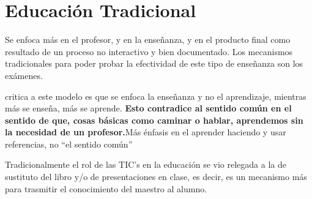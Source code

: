 \section{Educación Tradicional}


Se enfoca más en el profesor, y en la enseñanza, y en el producto final como
resultado de un proceso no interactivo y bien
documentado\cite{igi:instructionism}. Los mecanismos tradicionales para poder
probar la efectividad de este tipo de enseñanza son los exámenes.

 critica a este modelo es que se enfoca la
enseñanza y no el aprendizaje, mientras más se enseña, más se aprende.
\textbf{Esto contradice al sentido común en el sentido de que, cosas básicas
    como caminar o hablar, aprendemos sin la necesidad de un
    profesor\cite{ackoff:education}\cite{johnson2005instructionism}.}{Más
    énfasis en el aprender haciendo y usar referencias, no ``el sentido común''}

Tradicionalmente el rol de las TIC's en la educación se vio relegada a la de
sustituto del libro y/o de presentaciones en clase, es decir, es un mecanismo
más para trasmitir el conocimiento del maestro al alumno.

